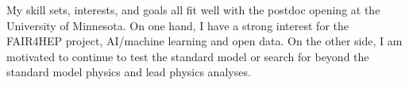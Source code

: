 \documentclass[11pt]{article}
\begin{document}






\bigskip



My skill sets, interests, and goals all fit well with the postdoc opening at the University of Minnesota. On one hand, I have a strong interest for the FAIR4HEP project, AI/machine learning and open data. On the other side, I am motivated to continue to test the standard model or search for beyond the standard model physics and lead  physics analyses. 
\end{document}
